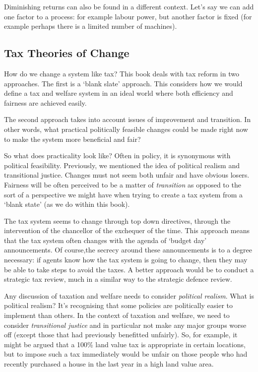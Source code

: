 \documentclass[]{tufte-handout}
\begin{document}
Diminishing returns can also be found in a different context. Let's say
we can add one factor to a process: for example labour power, but
another factor is fixed (for example perhaps there is a limited number
of machines).

\hypertarget{tax-theories-of-change}{%
\subsection{Tax Theories of Change}\label{tax-theories-of-change}}

How do we change a system like tax? This book deals with tax reform in
two approaches. The first is a `blank slate' approach. This considers
how we would define a tax and welfare system in an ideal world where
both efficiency and fairness are achieved easily.

The second approach takes into account issues of improvement and
transition. In other words, what practical politically feasible changes
could be made right now to make the system more beneficial and fair?

So what does practicality look like? Often in policy, it is synonymous
with political feasibility. Previously, we mentioned the idea of
political realism and transitional justice. Changes must not seem both
unfair and have obvious losers. Fairness will be often perceived to be a
matter of \emph{transition} as opposed to the sort of a perspective we
might have when trying to create a tax system from a `blank state' (as
we do within this book).

The tax system seems to change through top down directives, through the
intervention of the chancellor of the exchequer of the time. This
approach means that the tax system often changes with the agenda of
`budget day' announcements. Of course,the secrecy around these
announcements is to a degree necessary: if agents know how the tax
system is going to change, then they may be able to take steps to avoid
the taxes. A better approach would be to conduct a strategic tax review,
much in a similar way to the strategic defence review.

Any discussion of taxation and welfare needs to consider \emph{political
realism}. What is political realism? It's recognising that some policies
are politically easier to implement than others. In the context of
taxation and welfare, we need to consider \emph{transitional justice}
and in particular not make any major groups worse off (except those that
had previously benefitted unfairly). So, for example, it might be argued
that a 100\% land value tax is appropriate in certain locations, but to
impose such a tax immediately would be unfair on those people who had
recently purchased a house in the last year in a high land value area.
\end{document}
